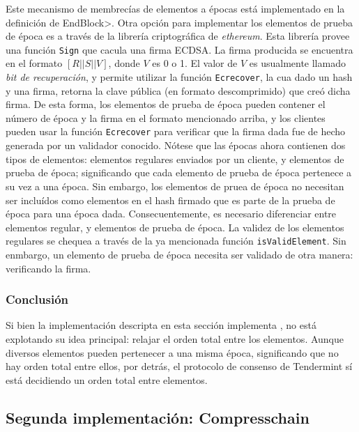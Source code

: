 %
Este mecanismo de membrecías de elementos a épocas está implementado en la definición de
\<EndBlock>.
%
Otra opción para implementar los elementos de prueba de época es a través de la librería
criptográfica de \textit{ethereum}.
%
Esta librería provee una función \texttt{Sign} que cacula una firma ECDSA.
%
La firma producida se encuentra en el formato $[R || S || V]$, donde $V$ es 0 o 1.
%
El valor de $V$ es usualmente llamado \textit{bit de recuperación}, y permite utilizar
la función \texttt{Ecrecover}, la cua dado un hash y una firma, retorna la clave pública
(en formato descomprimido) que creó dicha firma.
%
De esta forma, los elementos de prueba de época pueden contener el número de época y la firma
en el formato mencionado arriba, y los clientes pueden usar la función \texttt{Ecrecover} para
verificar que la firma dada fue de hecho generada por un validador conocido.
%
Nótese que las épocas ahora contienen dos tipos de elementos: elementos regulares enviados por
un cliente, y elementos de prueba de época; significando que cada elemento de prueba de época
pertenece a su vez a una época. Sin embargo, los elementos de pruea de época no necesitan ser
incluídos como elementos en el hash firmado que es parte de la prueba de época para una época
dada.
%
Consecuentemente, es necesario diferenciar entre elementos regular, y elementos de prueba de época.
%
La validez de los elementos regulares se chequea a través de la ya mencionada función
\texttt{isValidElement}.
%
Sin enmbargo, un elemento de prueba de época necesita ser validado de otra manera: verificando la firma.
%

\subsubsection{Conclusión}
Si bien la implementación descripta en esta sección implementa \setchain, no está explotando su idea
principal: relajar el orden total entre los elementos.
%
Aunque diversos elementos pueden pertenecer a una misma época, significando que no hay orden total
entre ellos, por detrás, el protocolo de consenso de Tendermint sí está decidiendo un orden total
entre elementos.
%
%



\subsection{Segunda implementación: Compresschain}\label{subsec:compresschain}

